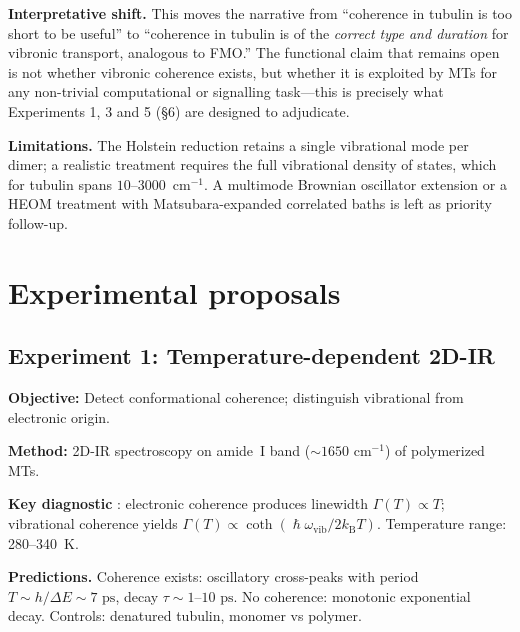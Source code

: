 \documentclass[twocolumn,10pt]{article}
\renewcommand{\hbar}{\hslash}
\newcommand{\kB}{k_{\text{B}}}
\newcommand{\ps}{\text{~ps}}
\begin{document}
\textbf{Interpretative shift.} This moves the narrative from ``coherence
in tubulin is too short to be useful'' to ``coherence in tubulin is of the
\emph{correct type and duration} for vibronic transport, analogous to
FMO.'' The functional claim that remains open is not whether vibronic
coherence exists, but whether it is exploited by MTs for any
non-trivial computational or signalling task---this is precisely what
Experiments 1, 3 and 5 (\S 6) are designed to adjudicate.

\textbf{Limitations.} The Holstein reduction retains a single vibrational
mode per dimer; a realistic treatment requires the full vibrational
density of states, which for tubulin spans $10\text{--}3000$~cm$^{-1}$. A
multimode Brownian oscillator extension \cite{Mukamel1995} or a HEOM
treatment with Matsubara-expanded correlated baths is left as priority
follow-up.



\section{Experimental proposals}

\subsection{Experiment 1: Temperature-dependent 2D-IR}
\label{sec:exp1}

\textbf{Objective:} Detect conformational coherence; distinguish
vibrational from electronic origin.

\textbf{Method:} 2D-IR spectroscopy on amide~I band ($\sim 1650\text{~cm}^{-1}$)
of polymerized MTs.

\textbf{Key diagnostic} \cite{Christensson2012,Dean2017}: electronic
coherence produces linewidth $\Gamma(T) \propto T$; vibrational coherence
yields $\Gamma(T) \propto \coth(\hbar\omega_{\text{vib}}/2\kB T)$.
Temperature range: 280--340~K.

\textbf{Predictions.} Coherence exists: oscillatory cross-peaks with period
$T \sim h/\Delta E \sim 7\ps$, decay $\tau \sim 1\text{--}10\ps$. No
coherence: monotonic exponential decay. Controls: denatured tubulin,
monomer vs polymer.
\end{document}
